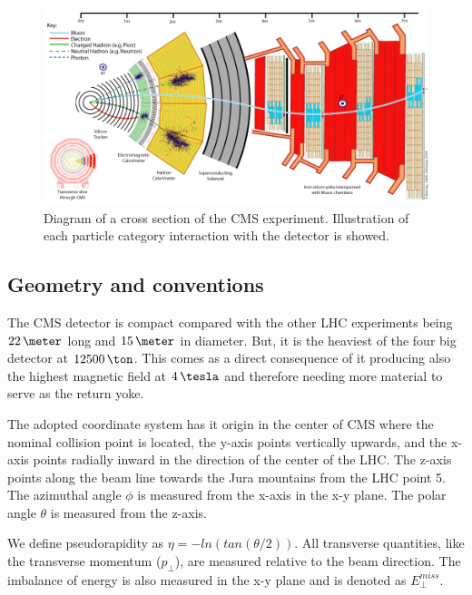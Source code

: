 \begin{figure}[!htb]
  \centering
  \includegraphics[width=1.00\textwidth]{Chapter02/CMS/Images/CMS_Slice.png}
  \caption{Diagram of a cross section of the \gls{CMS} experiment. Illustration of each particle category interaction with the detector is showed.}
  \label{FIGURE:ExperimentalApparatus_CMS_Slice}
\end{figure}

\subsection{Geometry and conventions}


The \gls{CMS} detector is compact compared with the other \gls{LHC} experiments being $22\,\meter$ long and $15\,\meter$ in diameter. But, it is the heaviest of the four big detector at $12500\,\ton$. This comes as a direct consequence of it producing also the highest magnetic field at $4\,\tesla$ and therefore needing more material to serve as the return yoke.

The adopted coordinate system has it origin in the center of \gls{CMS} where the nominal collision point is located, the y-axis points vertically upwards, and the x-axis points radially inward in the direction of the center of the \gls{LHC}. The z-axis points along the beam line towards the Jura mountains from the \gls{LHC} point 5. The azimuthal angle $\phi$ is measured from the x-axis in the x-y plane. The polar angle $\theta$ is measured from the z-axis.

We define pseudorapidity as $\eta = -ln(tan(\theta/2))$. All transverse quantities, like the transverse momentum ($p_\perp$), are measured relative to the beam direction. The imbalance of energy is also measured in the x-y plane and is denoted as $E^{miss}_\perp$.

